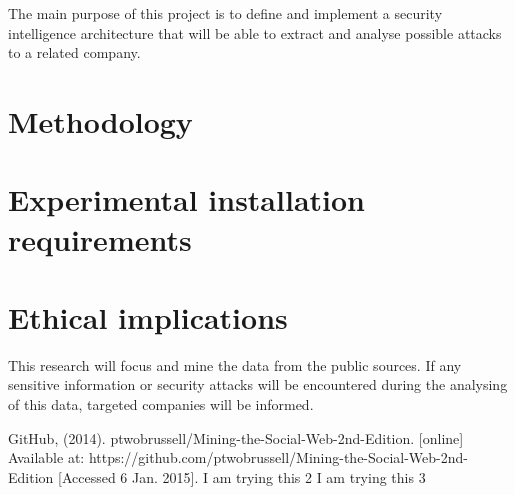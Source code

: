 \documentclass[12pt]{article}
\begin{document}
The main purpose of this project is to define and implement a security intelligence architecture that will be able to extract and analyse possible attacks to a related company. 

 
\section{Methodology}

\section{Experimental installation requirements}


\section{Ethical implications}

This research will focus and mine the data from the public sources. If any sensitive information or security attacks will be encountered during the analysing of this data, targeted companies will be informed. 




\begin{thebibliography}{99}
  GitHub, (2014). ptwobrussell/Mining-the-Social-Web-2nd-Edition. [online] Available at: https://github.com/ptwobrussell/Mining-the-Social-Web-2nd-Edition [Accessed 6 Jan. 2015].
  I am trying this 2 
  I am trying this 3
\end{thebibliography}
\end{document}
